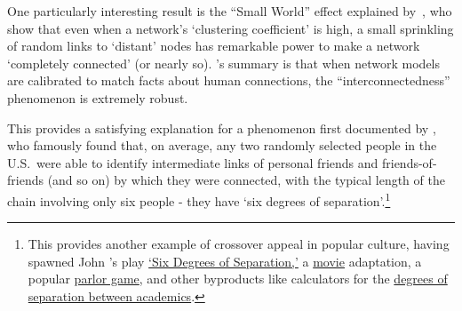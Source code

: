 \hypertarget{ItsASmallWorldAfterAll}{}

One particularly interesting result is the ``Small World'' effect explained by~\cite{wsSmallWorld}, who show that even when a network's `clustering coefficient' is high, a small sprinkling of random links to `distant' nodes has remarkable power to make a network `completely connected' (or nearly so).  \cite{barabasi2016network}'s summary is that when network models are calibrated to match facts about human connections, the ``interconnectedness'' phenomenon is extremely robust.

This provides a satisfying explanation for a phenomenon first documented by \cite{milgram1967small}, who famously found that, on average, any two randomly selected people in the U.S.\ were able to identify intermediate links of personal friends and friends-of-friends (and so on) by which they were connected, with the typical length of the chain involving only six people - they have `six degrees of separation'.\footnote{This provides another example of crossover appeal in popular culture, having spawned John \cite{guareSixDegrees}'s play \href{https://en.wikipedia.org/wiki/Six_Degrees_of_Separation_(play)}{`Six Degrees of Separation,'} a \href{https://en.wikipedia.org/wiki/Six_Degrees_of_Separation_(film)}{movie} adaptation, a popular \href{https://en.wikipedia.org/wiki/Six_Degrees_of_Kevin_Bacon}{parlor game}, and other byproducts like calculators for the \href{https://oakland.edu/enp/}{degrees of separation between academics}.} %



